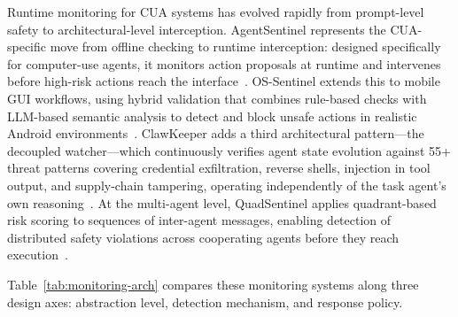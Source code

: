 Runtime monitoring for CUA systems has evolved rapidly from prompt-level safety to architectural-level interception. AgentSentinel represents the CUA-specific move from offline checking to runtime interception: designed specifically for computer-use agents, it monitors action proposals at runtime and intervenes before high-risk actions reach the interface~\cite{agentsentinel2025}. OS-Sentinel extends this to mobile GUI workflows, using hybrid validation that combines rule-based checks with LLM-based semantic analysis to detect and block unsafe actions in realistic Android environments~\cite{ossentinel2025}. ClawKeeper adds a third architectural pattern---the decoupled watcher---which continuously verifies agent state evolution against 55+ threat patterns covering credential exfiltration, reverse shells, injection in tool output, and supply-chain tampering, operating independently of the task agent's own reasoning~\cite{clawkeeper2026}. At the multi-agent level, QuadSentinel applies quadrant-based risk scoring to sequences of inter-agent messages, enabling detection of distributed safety violations across cooperating agents before they reach execution~\cite{quadsentinel2025}.

Table~\ref{tab:monitoring-arch} compares these monitoring systems along three design axes: abstraction level, detection mechanism, and response policy.

